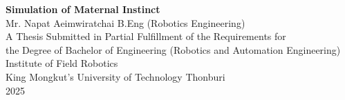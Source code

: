 
\newpage
\begin{titlepage}
    \centering
    
    \textbf{Simulation of Maternal Instinct}\\[1cm]
    
    Mr. Napat Aeimwiratchai B.Eng (Robotics Engineering)\\[2cm]
    
    A Thesis Submitted in Partial Fulfillment of the Requirements for\\
    the Degree of Bachelor of Engineering (Robotics and Automation Engineering)\\
    Institute of Field Robotics\\
    King Mongkut's University of Technology Thonburi\\
    2025\\[4cm]
    
    

\end{titlepage}
